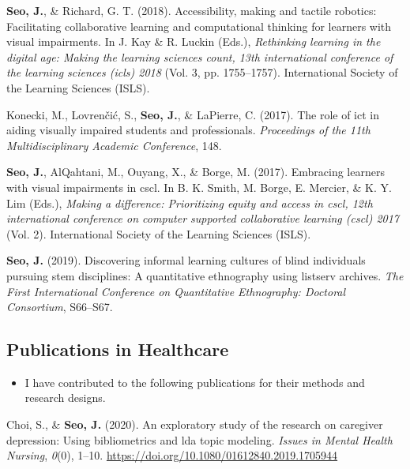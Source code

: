\documentclass[11pt, a4paper]{awesome-cv}
\providecommand{\tightlist}{%
	\setlength{\itemsep}{0pt}\setlength{\parskip}{0pt}}
\begin{document}
\leavevmode\hypertarget{ref-seo2018accessibility}{}%
\textbf{Seo, J.}, \& Richard, G. T. (2018). Accessibility, making and
tactile robotics: Facilitating collaborative learning and computational
thinking for learners with visual impairments. In J. Kay \& R. Luckin
(Eds.), \emph{Rethinking learning in the digital age: Making the
learning sciences count, 13th international conference of the learning
sciences (icls) 2018} (Vol. 3, pp. 1755--1757). International Society of
the Learning Sciences (ISLS).

\leavevmode\hypertarget{ref-konecki2017role}{}%
Konecki, M., Lovrenčić, S., \textbf{Seo, J.}, \& LaPierre, C. (2017).
The role of ict in aiding visually impaired students and professionals.
\emph{Proceedings of the 11th Multidisciplinary Academic Conference},
148.

\leavevmode\hypertarget{ref-seo2017embracing}{}%
\textbf{Seo, J.}, AlQahtani, M., Ouyang, X., \& Borge, M. (2017).
Embracing learners with visual impairments in cscl. In B. K. Smith, M.
Borge, E. Mercier, \& K. Y. Lim (Eds.), \emph{Making a difference:
Prioritizing equity and access in cscl, 12th international conference on
computer supported collaborative learning (cscl) 2017} (Vol. 2).
International Society of the Learning Sciences (ISLS).

\leavevmode\hypertarget{ref-seo2019discovering}{}%
\textbf{Seo, J.} (2019). Discovering informal learning cultures of blind
individuals pursuing stem disciplines: A quantitative ethnography using
listserv archives. \emph{The First International Conference on
Quantitative Ethnography: Doctoral Consortium}, S66--S67.

\endgroup

\hypertarget{publications-in-healthcare}{%
\subsection{Publications in
Healthcare}\label{publications-in-healthcare}}

\begin{itemize}
\tightlist
\item
  I have contributed to the following publications for their methods and
  research designs.
\end{itemize}

\begingroup
\setlength{\parindent}{-0.5in}
\setlength{\leftskip}{0.5in}

\hypertarget{refs_healthcare}{}
\leavevmode\hypertarget{ref-doi:10.1080ux2f01612840.2019.1705944}{}%
Choi, S., \& \textbf{Seo, J.} (2020). An exploratory study of the
research on caregiver depression: Using bibliometrics and lda topic
modeling. \emph{Issues in Mental Health Nursing}, \emph{0}(0), 1--10.
\url{https://doi.org/10.1080/01612840.2019.1705944}
\end{document}
